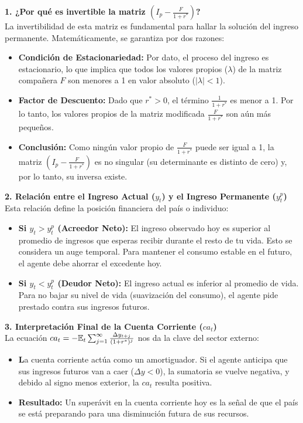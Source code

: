 \textbf{1. ¿Por qué es invertible la matriz $(I_p - \frac{F}{1+r^*})$?} \\
La invertibilidad de esta matriz es fundamental para hallar la solución del ingreso permanente. Matemáticamente, se garantiza por dos razones:
\begin{itemize}
    \item \textbf{Condición de Estacionariedad:} Por dato, el proceso del ingreso es estacionario, lo que implica que todos los valores propios ($\lambda$) de la matriz compañera $F$ son menores a 1 en valor absoluto ($|\lambda| < 1$).
    \item \textbf{Factor de Descuento:} Dado que $r^* > 0$, el término $\frac{1}{1+r^*}$ es menor a 1. Por lo tanto, los valores propios de la matriz modificada $\frac{F}{1+r^*}$ son aún más pequeños. 
    \item \textbf{Conclusión:} Como ningún valor propio de $\frac{F}{1+r^*}$ puede ser igual a 1, la matriz $(I_p - \frac{F}{1+r^*})$ es no singular (su determinante es distinto de cero) y, por lo tanto, su inversa existe.
\end{itemize}

\textbf{2. Relación entre el Ingreso Actual ($y_t$) y el Ingreso Permanente ($y_t^p$)} \\
Esta relación define la posición financiera del país o individuo:
\begin{itemize}
    \item \textbf{Si $y_t > y_t^p$ (Acreedor Neto):} El ingreso observado hoy es superior al promedio de ingresos que esperas recibir durante el resto de tu vida. Esto se considera un auge temporal. Para mantener el consumo estable en el futuro, el agente debe ahorrar el excedente hoy.
    \item \textbf{Si $y_t < y_t^p$ (Deudor Neto):} El ingreso actual es inferior al promedio de vida. Para no bajar su nivel de vida (suavización del consumo), el agente pide prestado contra sus ingresos futuros.
\end{itemize}

\textbf{3. Interpretación Final de la Cuenta Corriente ($ca_t$)} \\
La ecuación $ca_t = -\mathbb{E}_t \sum_{j=1}^{\infty} \frac{\Delta y_{t+j}}{(1+r^*)^j}$ nos da la clave del sector externo:
\begin{itemize}
    \item \textbf La cuenta corriente actúa como un amortiguador. Si el agente anticipa que sus ingresos futuros van a caer ($\Delta y < 0$), la sumatoria se vuelve negativa, y debido al signo menos exterior, la $ca_t$ resulta positiva. 
    \item \textbf{Resultado:} Un superávit en la cuenta corriente hoy es la señal de que el país se está preparando para una disminución futura de sus recursos.
\end{itemize}

